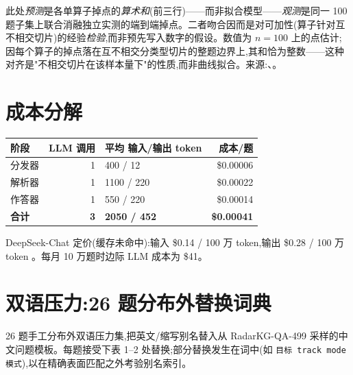 \documentclass[11pt,a4paper]{article}
\begin{document}
此处\emph{预测}是各单算子掉点的\emph{算术和}(前三行)——而非拟合模型——\emph{观测}是同一 100 题子集上联合消融独立实测的端到端掉点。二者吻合因而是对可加性(算子针对互不相交切片)的经验\emph{检验},而非预先写入数字的假设。数值为 $n{=}100$ 上的点估计;因每个算子的掉点落在互不相交分类型切片的整题边界上,其和恰为整数——这种对齐是"不相交切片在该样本量下"的性质,而非曲线拟合。来源:、。

\section{成本分解}
\label{app:cost}

\begin{table}[h]
\centering\small
\begin{tabular}{l r l r}
\toprule
\textbf{阶段} & \textbf{LLM 调用} & \textbf{平均 输入/输出 token} & \textbf{成本/题} \\
\midrule
分发器 & 1 & 400 / 12   & \$0.00006 \\
解析器 & 1 & 1100 / 220 & \$0.00022 \\
作答器 & 1 & 550 / 220  & \$0.00014 \\
\midrule
\textbf{合计} & \textbf{3} & \textbf{2050 / 452} & \textbf{\$0.00041} \\
\bottomrule
\end{tabular}
\end{table}

DeepSeek-Chat 定价(缓存未命中):输入 \$0.14 / 100 万 token,输出 \$0.28 / 100 万 token \citep{deepseek_api}。每月 10 万题时边际 LLM 成本为 \$41。

\section{双语压力:26 题分布外替换词典}
\label{app:bilingual}

26 题手工分布外双语压力集,把英文/缩写别名替入从 RadarKG-QA-499 采样的中文问题模板。每题接受下表 1--2 处替换;部分替换发生在词中(如 \texttt{目标 track mode 模式}),以在精确表面匹配之外考验别名索引。
\end{document}
